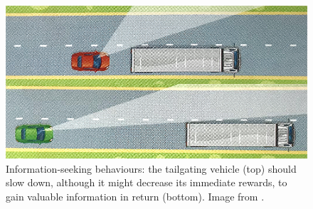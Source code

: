 \begin{figure}[th]
	\centering
	\includegraphics[width=0.7\linewidth]{img/pomdp}
	\caption{Information-seeking behaviours: the tailgating vehicle (top) should slow down, although it might decrease its immediate rewards, to gain valuable information in return (bottom). Image from \citep{ObjCode2017}.}
	\label{fig:information-seeking}
\end{figure}


